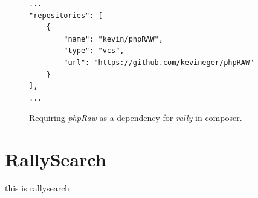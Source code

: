 \documentclass[msc,oneside]{ubcthesis}%
\begin{document}
\begin{figure}[H]
\begin{lstlisting}
...
"repositories": [
	{
		"name": "kevin/phpRAW",
		"type": "vcs",
		"url": "https://github.com/kevineger/phpRAW"
	}
],
...
\end{lstlisting}
\caption[Requiring phpRaw as a dependency in composer.]{
Requiring \textit{phpRaw} as a dependency for \textit{rally} in composer.}
\label{fig:composer}
\end{figure}

\section{RallySearch}
this is rallysearch

\newpage %
\pagestyle{fancy}\rhead{}\cfoot{}\rfoot{\thepage}

\end{document}
